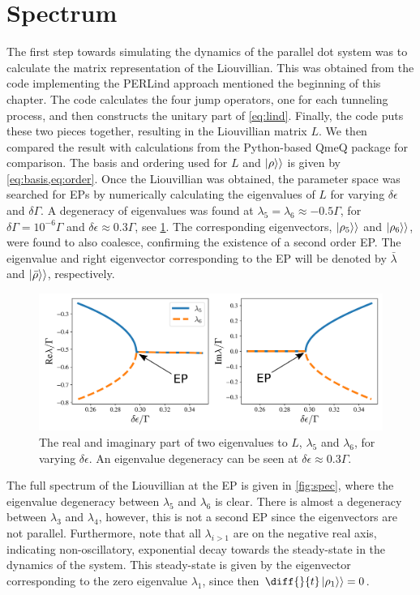 \documentclass[../main.tex]{subfiles}
\begin{document}
\section{Spectrum}
The first step towards simulating the dynamics of the parallel dot system was to calculate the matrix representation of the Liouvillian. This was obtained from the code implementing the PERLind approach mentioned the beginning of this chapter. The code calculates the four jump operators, one for each tunneling process, and then constructs the unitary part of \cref{eq:lind}. Finally, the code puts these two pieces together, resulting in the Liouvillian matrix $L$. We then compared the result with calculations from the Python-based QmeQ package \cite{qmeq} for comparison. The basis and ordering used for $L$ and $\ket{\rho}\rangle$ is given by \cref{eq:basis,eq:order}. Once the Liouvillian was obtained, the parameter space was searched for EPs by numerically calculating the eigenvalues of $L$ for varying $\delta\epsilon$ and $\delta\Gamma$. A degeneracy of eigenvalues was found at $\lambda_5 = \lambda_6\approx -0.5\Gamma$, for $\delta\Gamma = 10^{-6}\Gamma$ and $\delta\epsilon \approx 0.3\Gamma$, see \cref{fig:tuning}. The corresponding eigenvectors, $\ket{\rho_5}\rangle$ and $\ket{\rho_6}\rangle$, were found to also coalesce, confirming the existence of a second order EP. The eigenvalue and right eigenvector corresponding to the EP will be denoted by $\bar \lambda$ and $\ket{\bar\rho}\rangle$, respectively.
\begin{figure}[H]
    \centering
    \includegraphics[width=0.9\linewidth]{figures/tuning.png}
    \caption{The real and imaginary part of two eigenvalues to $L$, $\lambda_5$ and $\lambda_6$, for varying $\delta\epsilon$. An eigenvalue degeneracy can be seen at $\delta\epsilon\approx0.3\Gamma$.}
    \label{fig:tuning}
\end{figure}
The full spectrum of the Liouvillian at the EP is given in \cref{fig:spec}, where the eigenvalue degeneracy between $\lambda_5$ and $\lambda_6$ is clear. There is almost a degeneracy between $\lambda_3$ and $\lambda_4$, however, this is not a second EP since the eigenvectors are not parallel. Furthermore, note that all $\lambda_{i>1}$ are on the negative real axis, indicating non-oscillatory, exponential decay towards the steady-state in the dynamics of the system. This steady-state is given by the eigenvector corresponding to the zero eigenvalue $\lambda_1$, since then $\diff{}{t}\ket{\rho_1}\rangle = 0$.
\end{document}
